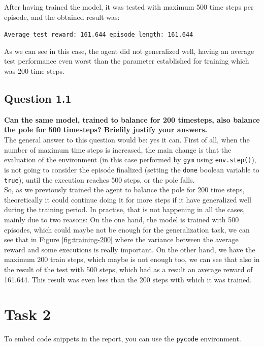 \documentclass[12pt]{article}
\begin{document}
After having trained the model, it was tested with maximum 500 time steps per episode, and the obtained result was:

\begin{center}
    \texttt{Average test reward: 161.644 episode length: 161.644}
\end{center}

As we can see in this case, the agent did not generalized well, having an average test performance even worst than the parameter established for training which was 200 time steps.

\subsection{Question 1.1}
\label{sec:question-1.1}
\textbf {
    Can the same model, trained to balance for 200 timesteps, also balance the pole for 500 timesteps? Briefily justify your answers.
}\\

The general answer to this question would be: yes it can. First of all, when the number of maximum time steps is increased, the main change is that the evaluation of the environment (in this case performed by \texttt{gym} using \texttt{env.step()}), is not going to consider the episode finalized (setting the \texttt{done} boolean variable to \texttt{true}), until the execution reaches 500 steps, or the pole falls.\\

So, as we previously trained the agent to balance the pole for 200 time steps, theoretically it could continue doing it for more steps if it have generalized well during the training period. In practise, that is not happening in all the cases, mainly due to two reasons: On the one hand, the model is trained with 500 episodes, which could maybe not be enough for the generalization task, we can see that in Figure \ref{fig:training-200} where the variance between the average reward and some executions is really important. On the other hand, we have the maximum 200 train steps, which maybe is not enough too, we can see that also in the result of the test with 500 steps, which had as a result an average reward of 161.644. This result was even less than the 200 steps with which it was trained. 


\section{Task 2}
To embed code snippets in the report, you can use the \texttt{pycode} environment.
\end{document}
